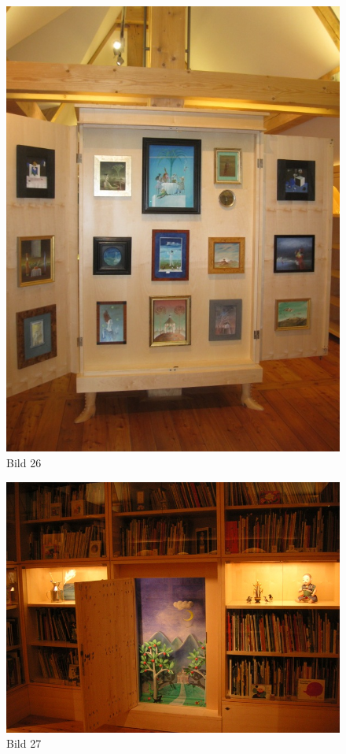 \documentclass[a4paper,
fontsize=11pt,
oneside,
numbers=noperiodatend,
parskip=half-,
bibliography=totoc,
final
]{scrartcl}
\begin{document}
\begin{figure}[htbp]
\centering
\includegraphics{img/Bild26.jpg}
\caption{Bild 26}
\end{figure}

\begin{figure}[htbp]
\centering
\includegraphics{img/Bild27.jpg}
\caption{Bild 27}
\end{figure}
\end{document}
